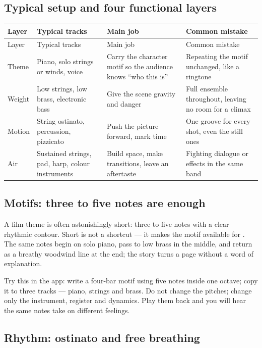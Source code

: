 \subsection{Typical setup and four functional layers}
\label{sec:film-instrumentation}

\begin{longtable}{p{}p{}p{}p{}}
\toprule
Layer & Typical tracks & Main job & Common mistake \\
\midrule
\endfirsthead
\toprule
Layer & Typical tracks & Main job & Common mistake \\
\midrule
\endhead
Theme & Piano, solo strings or winds, voice & Carry the character motif so the audience knows ``who this is'' & Repeating the motif unchanged, like a ringtone \\
Weight & Low strings, low brass, electronic bass & Give the scene gravity and danger & Full ensemble throughout, leaving no room for a climax \\
Motion & String ostinato, percussion, pizzicato & Push the picture forward, mark time & One groove for every shot, even the still ones \\
Air & Sustained strings, pad, harp, colour instruments & Build space, make transitions, leave an aftertaste & Fighting dialogue or effects in the same band \\
\bottomrule
\end{longtable}

\subsection{Motifs: three to five notes are enough}
\label{sec:film-motif}

A film theme is often astonishingly short: three to five notes with a clear rhythmic contour. Short is not a shortcut --- it makes the motif available for . The same notes begin on solo piano, pass to low brass in the middle, and return as a breathy woodwind line at the end; the story turns a page without a word of explanation.

Try this in the app: write a four-bar motif using five notes inside one octave; copy it to three tracks --- piano, strings and brass. Do not change the pitches; change only the instrument, register and dynamics. Play them back and you will hear the same notes take on different feelings.

\subsection{Rhythm: ostinato and free breathing}
\label{sec:film-rhythm}

